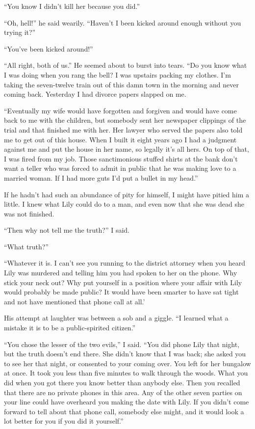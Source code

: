 \documentclass{novel}
\begin{document}
“You know I didn’t kill her because you did.”

“Oh, hell!” he said wearily. “Haven’t I been kicked around enough without you trying it?”

“You’ve been kicked around!”

“All right, both of us.” He seemed about to burst into tears. “Do you know what I was doing when you rang the bell? I was upstairs packing my clothes. I’m taking the seven-twelve train out of this damn town in the morning and never coming back. Yesterday I had divorce papers slapped on me.

“Eventually my wife would have forgotten and forgiven and would have come back to me with the children, but somebody sent her newspaper clippings of the trial and that finished me with her. Her lawyer who served the papers also told me to get out of this house. When I built it eight years ago I had a judgment against me and put the house in her name, so legally it’s all hers. On top of that, I was fired from my job. Those sanctimonious stuffed shirts at the bank don’t want a teller who was forced to admit in public that he was making love to a married woman. If I had more guts I’d put a bullet in my head.”

\scenestars

If he hadn’t had such an abundance of pity for himself, I might have pitied him a little. I knew what Lily could do to a man, and even now that she was dead she was not finished.

“Then why not tell me the truth?” I said.

“What truth?”

“Whatever it is. I can’t see you running to the district attorney when you heard Lily was murdered and telling him you had spoken to her on the phone. Why stick your neck out? Why put yourself in a position where your affair with Lily would probably be made public? It would have been smarter to have sat tight and not have mentioned that phone call at all.’

His attempt at laughter was between a sob and a giggle. “I learned what a mistake it is to be a public-spirited citizen.”

“You chose the lesser of the two evils,” I said. “You did phone Lily that night, but the truth doesn’t end there. She didn’t know that I was back; she asked you to see her that night, or consented to your coming over. You left for her bungalow at once. It took you less than five minutes to walk through the woods. What you did when you got there you know better than anybody else. Then you recalled that there are no private phones in this area. Any of the other seven parties on your line could have overheard you making the date with Lily. If you didn’t come forward to tell about that phone call, somebody else might, and it would look a lot better for you if you did it yourself.”
\end{document}
